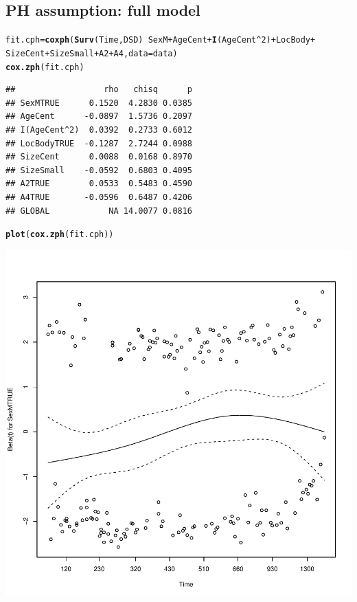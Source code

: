 \documentclass{article}\usepackage[]{graphicx}\usepackage[]{color}
\makeatletter
\def\maxwidth{ %
  \ifdim\Gin@nat@width>\linewidth
    \linewidth
  \else
    \Gin@nat@width
  \fi
}
\newcommand{\hlnum}[1]{\textcolor[rgb]{0.686,0.059,0.569}{#1}}%
\newcommand{\hlopt}[1]{\textcolor[rgb]{0,0,0}{#1}}%
\newcommand{\hlstd}[1]{\textcolor[rgb]{0.345,0.345,0.345}{#1}}%
\newcommand{\hlkwb}[1]{\textcolor[rgb]{0.69,0.353,0.396}{#1}}%
\newcommand{\hlkwc}[1]{\textcolor[rgb]{0.333,0.667,0.333}{#1}}%
\newcommand{\hlkwd}[1]{\textcolor[rgb]{0.737,0.353,0.396}{\textbf{#1}}}%
\newenvironment{kframe}{%
 \def\at@end@of@kframe{}%
 \ifinner\ifhmode%
  \def\at@end@of@kframe{\end{minipage}}%
  \begin{minipage}{\columnwidth}%
 \fi\fi%
 \def\FrameCommand##1{\hskip\@totalleftmargin \hskip-\fboxsep
 \colorbox{shadecolor}{##1}\hskip-\fboxsep
     \hskip-\linewidth \hskip-\@totalleftmargin \hskip\columnwidth}%
 \MakeFramed {\advance\hsize-\width
   \@totalleftmargin\z@ \linewidth\hsize
   \@setminipage}}%
 {\par\unskip\endMakeFramed%
 \at@end@of@kframe}
\newenvironment{knitrout}{}{} %
\makeatother
\begin{document}
\subsection{PH assumption: full model}
\begin{knitrout}
\color{fgcolor}\begin{kframe}
\begin{alltt}
\hlstd{fit.cph} \hlkwb{=} \hlkwd{coxph}\hlstd{(}\hlkwd{Surv}\hlstd{(Time, DSD)} \hlopt{~} \hlstd{SexM} \hlopt{+} \hlstd{AgeCent} \hlopt{+} \hlkwd{I}\hlstd{(AgeCent}\hlopt{^}\hlnum{2}\hlstd{)} \hlopt{+} \hlstd{LocBody} \hlopt{+}
    \hlstd{SizeCent} \hlopt{+} \hlstd{SizeSmall} \hlopt{+} \hlstd{A2} \hlopt{+} \hlstd{A4,} \hlkwc{data} \hlstd{= data)}
\hlkwd{cox.zph}\hlstd{(fit.cph)}
\end{alltt}
\begin{verbatim}
##                  rho   chisq      p
## SexMTRUE      0.1520  4.2830 0.0385
## AgeCent      -0.0897  1.5736 0.2097
## I(AgeCent^2)  0.0392  0.2733 0.6012
## LocBodyTRUE  -0.1287  2.7244 0.0988
## SizeCent      0.0088  0.0168 0.8970
## SizeSmall    -0.0592  0.6803 0.4095
## A2TRUE        0.0533  0.5483 0.4590
## A4TRUE       -0.0596  0.6487 0.4206
## GLOBAL            NA 14.0077 0.0816
\end{verbatim}
\begin{alltt}
\hlkwd{plot}\hlstd{(}\hlkwd{cox.zph}\hlstd{(fit.cph))}
\end{alltt}
\end{kframe}

{\centering \includegraphics[width=\maxwidth]{figure/eda-ph-check-full-1} 

}
\end{knitrout}
\end{document}
